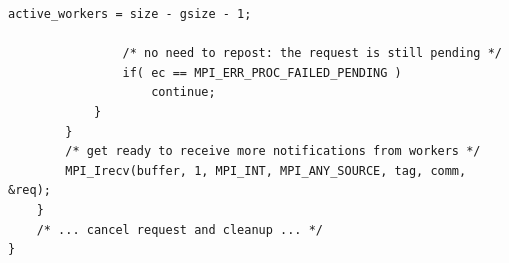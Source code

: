 \begin{example}
\begin{lstlisting}[language={[MPI]C}]
                active_workers = size - gsize - 1;

                /* no need to repost: the request is still pending */
                if( ec == MPI_ERR_PROC_FAILED_PENDING )
                    continue;
            }
        }
        /* get ready to receive more notifications from workers */
        MPI_Irecv(buffer, 1, MPI_INT, MPI_ANY_SOURCE, tag, comm, &req);
    }
    /* ... cancel request and cleanup ... */
}
\end{lstlisting}
\end{example}


